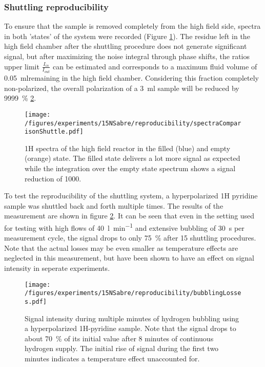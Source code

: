         \subsubsection{Shuttling reproducibility}
        \label{results:15N:shuttlingReproducibility}
            To ensure that the sample is removed completely from the high field side, spectra in both 'states' of the system were recorded (Figure \ref{fig:results:15N:shuttlingRemoval}). The residue left in the high field chamber after the shuttling procedure does not generate significant signal, but after maximizing the noise integral through phase shifts, the ratios upper limit $\frac{I_{in}}{I_{out}}$ can be estimated and corresponds to a maximum fluid volume of \SI{0.05}{ml}remaining in the high field chamber. Considering this fraction completely non-polarized, the overall polarization of a \SI{3}{ml} sample will be reduced by \SI{9999}{\percent} \ref{fig:results:15N:shuttlingReproducibility}.
            \begin{figure}
                \centering
                \texttt{[image: /figures/experiments/15NSabre/reproducibility/spectraComparisonShuttle.pdf]}
                \caption[High field removal efficiency]{1H spectra of the high field reactor in the filled (blue) and empty (orange) state. The filled state delivers a lot more signal as expected while the integration over the empty state spectrum shows a signal reduction of 1000.}
                \label{fig:results:15N:shuttlingRemoval}
            \end{figure}
            To test the reproducibility of the shuttling system, a hyperpolarized 1H pyridine sample was shuttled back and forth multiple times. The results of the measurement are shown in figure \ref{fig:results:15N:shuttlingReproducibility}. It can be seen that even in the setting used for testing with high flows of \SI{40}{\litre\per\minute} and extensive bubbling of \SI{30}{\second} per measurement cycle, the signal drops to only \SI{75}{\percent} after 15 shuttling procedures. Note that the actual losses may be even smaller as temperature effects are neglected in this measurement, but have been shown to have an effect on signal intensity in seperate experiments.
            \begin{figure}
                \label{fig:results:15N:shuttlingReproducibility}
                \centering
                \texttt{[image: /figures/experiments/15NSabre/reproducibility/bubblingLosses.pdf]}
                \caption[Bubbling fluid losses]{Signal intensity during multiple minutes of hydrogen bubbling using a hyperpolarized 1H-pyridine sample. Note that the signal drops to about \SI{70}{\percent} of its initial value after 8 minutes of continuous hydrogen supply. The initial rise of signal during the first two minutes indicates a temperature effect unaccounted for.}
            \end{figure}
